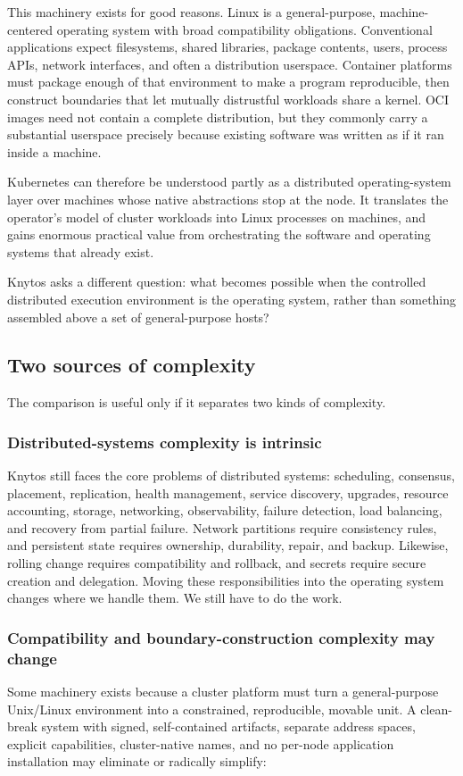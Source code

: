 This machinery exists for good reasons. Linux is a general-purpose,
machine-centered operating system with broad compatibility obligations.
Conventional applications expect filesystems, shared libraries, package
contents, users, process APIs, network interfaces, and often a distribution
userspace. Container platforms must package enough of that environment to
make a program reproducible, then construct boundaries that let mutually
distrustful workloads share a kernel. OCI images need not contain a complete
distribution, but they commonly carry a substantial userspace precisely
because existing software was written as if it ran inside a machine.

Kubernetes can therefore be understood partly as a distributed
operating-system layer over machines whose native abstractions stop at the
node. It translates the operator's model of cluster workloads into Linux
processes on machines, and gains enormous practical value from orchestrating
the software and operating systems that already exist.

Knytos asks a different question: what becomes possible when the
controlled distributed execution environment is the operating system,
rather than something assembled above a set of general-purpose hosts?

\subsection{Two sources of complexity}

The comparison is useful only if it separates two kinds of complexity.

\subsubsection{Distributed-systems complexity is intrinsic}
Knytos still faces the core problems of distributed systems:
scheduling, consensus, placement, replication, health management, service
discovery, upgrades, resource accounting, storage, networking, observability,
failure detection, load balancing, and recovery from partial failure. Network
partitions require consistency rules, and persistent state requires ownership,
durability, repair, and backup. Likewise, rolling change requires compatibility and
rollback, and secrets require secure creation and delegation. Moving these
responsibilities into the operating system changes where we handle them.
We still have to do the work.

\subsubsection{Compatibility and boundary-construction complexity may change}
Some machinery exists because a cluster platform must turn a
general-purpose Unix/Linux environment into a constrained, reproducible,
movable unit. A clean-break system with signed, self-contained artifacts,
separate address spaces, explicit capabilities, cluster-native names, and no
per-node application installation may eliminate or radically simplify:

